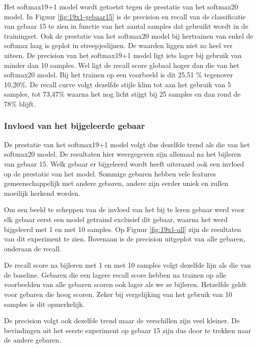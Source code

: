 Het softmax19+1 model wordt getoetst tegen de prestatie van het softmax20 model. In Figuur \ref{fig:19x1-gebaar15} is de precision en recall van de classificatie van gebaar 15 te zien in functie van het aantal samples dat gebruikt wordt in de trainingset. Ook de prestatie van het softmax20 model bij hertrainen van enkel de softmax laag is geplot in streepjeslijnen. De waarden liggen niet zo heel ver uiteen. De precision van het softmax19+1 model ligt iets lager bij gebruik van minder dan 10 samples. Wel ligt de recall score globaal hoger dan die van het softmax20 model. Bij het trainen op een voorbeeld is dit 25,51 \% tegenover 10,20\%. De recall curve volgt dezelfde stijle klim tot aan het gebruik van 5 samples, tot 73,47\% waarna het nog licht stijgt bij 25 samples en dan rond de 78\% blijft.

\subsubsection{Invloed van het bijgeleerde gebaar}

De prestatie van het softmax19+1 model volgt dus dezelfde trend als die van het softmax20 model. De resultaten hier weergegeven zijn allemaal na het bijleren van gebaar 15. Welk gebaar er bijgeleerd wordt heeft uiteraard ook een invloed op de prestatie van het model. Sommige gebaren hebben vele features gemeenschappelijk met andere gebaren, andere zijn eerder uniek en zullen moeilijk herkend worden.

\npar Om een beeld te scheppen van de invloed van het bij te leren gebaar werd voor elk gebaar eerst een model getraind exclusief dit gebaar, waarna het werd bijgeleerd met 1 en met 10 samples. Op Figuur \ref{fig:19x1-all} zijn de resultaten van dit experiment te zien. Bovenaan is de precision uitgeplot van alle gebaren, onderaan de recall.

\npar De recall score na bijleren met 1 en met 10 samples volgt dezelfde lijn als die van de baseline. Gebaren die een lagere recall score hebben na trainen op alle voorbeelden van alle gebaren scoren ook lager als we ze bijleren. Hetzelfde geldt voor gebaren die hoog scoren. Zeker bij vergelijking van het gebruik van 10 samples is dit opmerkelijk.

\npar De precision volgt ook dezelfde trend maar de verschillen zijn veel kleiner. De bevindingen uit het eerste experiment op gebaar 15 zijn dus door te trekken naar de andere gebaren.

